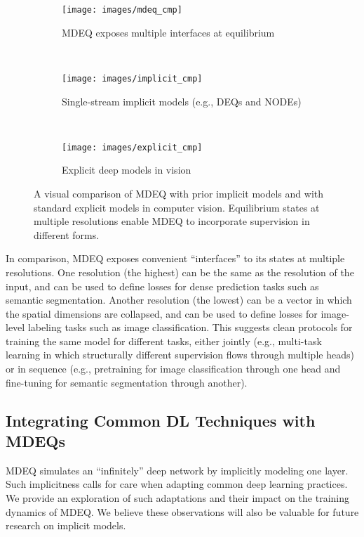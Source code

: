\documentclass{article}
\begin{document}
\begin{figure}[t]
\vspace{-.16in}
\centering
\begin{subfigure}[b]{0.41\textwidth}
\texttt{[image: images/mdeq\_cmp]}
\caption{MDEQ exposes multiple interfaces at equilibrium}
\label{subfig:mdeq}
\end{subfigure}
~
\begin{subfigure}[b]{0.275\textwidth}
\texttt{[image: images/implicit\_cmp]}
\caption{Single-stream implicit models (e.g., DEQs and NODEs)}
\label{subfig:implicit}
\end{subfigure}
~
\begin{subfigure}[b]{0.28\textwidth}
\texttt{[image: images/explicit\_cmp]}
\caption{Explicit deep models in vision}
\label{subfig:explicit}
\end{subfigure}
\caption{A visual comparison of MDEQ with prior implicit models and with standard explicit models in computer vision. Equilibrium states at multiple resolutions enable MDEQ to incorporate supervision in different forms.}
\label{fig:multiple-loss}
\vspace{-.2in}
\end{figure}

In comparison, MDEQ exposes convenient ``interfaces'' to its states at multiple resolutions. One resolution (the highest) can be the same as the resolution of the input, and can be used to define losses for dense prediction tasks such as semantic segmentation. Another resolution (the lowest) can be a vector in which the spatial dimensions are collapsed, and can be used to define losses for image-level labeling tasks such as image classification. This suggests clean protocols for training the same model for different tasks, either jointly (e.g., multi-task learning in which structurally different supervision flows through multiple heads) or in sequence (e.g., pretraining for image classification through one head and fine-tuning for semantic segmentation through another).


\subsection{Integrating Common DL Techniques with MDEQs}
\label{subsec:integrate}

MDEQ simulates an ``infinitely'' deep network by implicitly modeling one layer. Such implicitness calls for care when adapting common deep learning practices. We provide an exploration of such adaptations and their impact on the training dynamics of MDEQ. We believe these observations will also be valuable for future research on implicit models.
\end{document}
